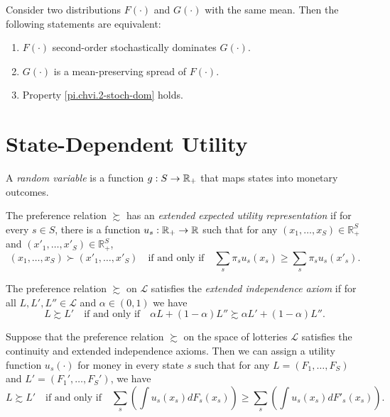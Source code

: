 \begin{prop}
    Consider two distributions $F(\cdot)$ and $G(\cdot)$ with the same mean. Then the following statements are equivalent:
    \begin{enumerate}
        \item $F(\cdot)$ second-order stochastically dominates $G(\cdot)$.
        \item $G(\cdot)$ is a mean-preserving spread of $F(\cdot)$.
        \item Property \ref{pi.chvi.2-stoch-dom} holds.
    \end{enumerate}
\end{prop}


\section{State-Dependent Utility}

\begin{defn}
    A \emph{random variable} is a function $g : S \to \mathbb{R}_+$ that maps states into monetary outcomes.
\end{defn}

\begin{defn}
    The preference relation $\succsim$ has an \emph{extended expected utility representation} if for every $s \in S$, there is a function $u_s : \mathbb{R}_+ \to \mathbb{R}$ such that for any $(x_1, \dots, x_S) \in \mathbb{R}^{S}_+$ and $(x'_1, \dots, x'_S) \in \mathbb{R}^{S}_+$,
    \begin{equation*}
        (x_1, \dots, x_S) \succ (x'_1, \dots, x'_S) \quad \text{if and only if} \quad \sum_s \pi_s u_s(x_s) \geq \sum_s \pi_s u_s(x'_s).
    \end{equation*}
\end{defn}

\begin{defn}
    The preference relation $\succsim$ on $\mathscr{L}$ satisfies the \emph{extended independence axiom} if for all $L, L', L'' \in \mathscr{L}$ and $\alpha \in (0, 1)$ we have
    \begin{equation*}
        L \succsim L' \quad \text{if and only if} \quad \alpha L + (1 - \alpha) L'' \succsim \alpha L' + (1 - \alpha) L''.
    \end{equation*}
\end{defn}

\begin{prop}
    Suppose that the preference relation $\succsim$ on the space of lotteries $\mathscr{L}$ satisfies the continuity and extended independence axioms. Then we can assign a utility function $u_s(\cdot)$ for money in every state $s$ such that for any $L = (F_1, \dots, F_S)$ and $L' = (F_1', \dots, F_S')$, we have
    \begin{equation*}
        L \succsim L' \quad \text{if and only if} \quad \sum_s \left(\int u_s(x_s)dF_s(x_s) \right) \geq \sum_s \left(\int u_s(x_s)dF'_s(x_s) \right).
    \end{equation*}
\end{prop}

